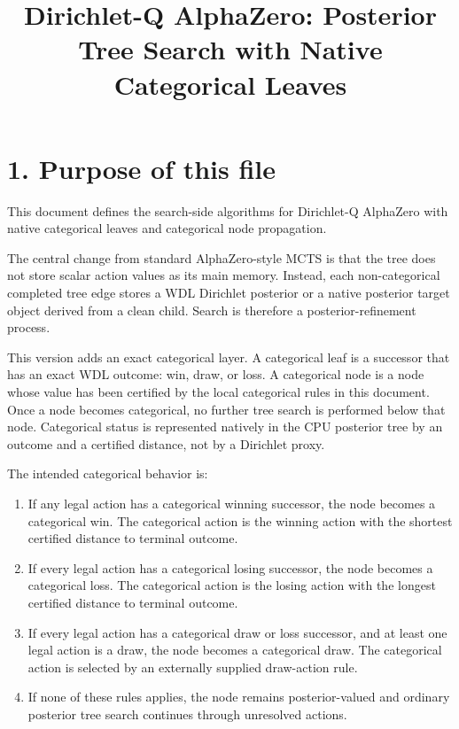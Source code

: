 \documentclass[11pt]{article}
\title{Dirichlet-Q AlphaZero: Posterior Tree Search with Native Categorical Leaves}
\author{}
\date{}
\begin{document}
\maketitle


\section*{1. Purpose of this file}

This document defines the search-side algorithms for Dirichlet-Q AlphaZero with
native categorical leaves and categorical node propagation.

The central change from standard AlphaZero-style MCTS is that the tree does not
store scalar action values as its main memory. Instead, each non-categorical
completed tree edge stores a WDL Dirichlet posterior or a native posterior target
object derived from a clean child. Search is therefore a posterior-refinement
process.

This version adds an exact categorical layer. A categorical leaf is a successor
that has an exact WDL outcome: win, draw, or loss. A categorical node is a node
whose value has been certified by the local categorical rules in this document.
Once a node becomes categorical, no further tree search is performed below that
node. Categorical status is represented natively in the CPU posterior tree by an
outcome and a certified distance, not by a Dirichlet proxy.

The intended categorical behavior is:

\begin{enumerate}[leftmargin=2em]
  \item If any legal action has a categorical winning successor, the node becomes
  a categorical win. The categorical action is the winning action with the
  shortest certified distance to terminal outcome.

  \item If every legal action has a categorical losing successor, the node
  becomes a categorical loss. The categorical action is the losing action with
  the longest certified distance to terminal outcome.

  \item If every legal action has a categorical draw or loss successor, and at
  least one legal action is a draw, the node becomes a categorical draw. The
  categorical action is selected by an externally supplied draw-action rule.

  \item If none of these rules applies, the node remains posterior-valued and
  ordinary posterior tree search continues through unresolved actions.
\end{enumerate}
\end{document}
